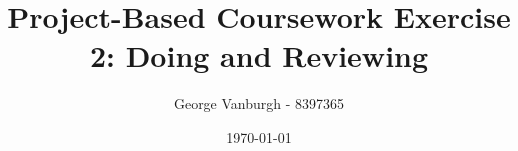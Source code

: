 \documentclass[a4paper,12pt,titlepage]{article}
\title{Project-Based Coursework Exercise 2: Doing and Reviewing}
\author{George Vanburgh - 8397365}
\date{\today}
\begin{document}
  \maketitle

  \tableofcontents
  \begin{versionhistory}
  \end{versionhistory}
  \newpage

  
  
  
  
\end{document}
